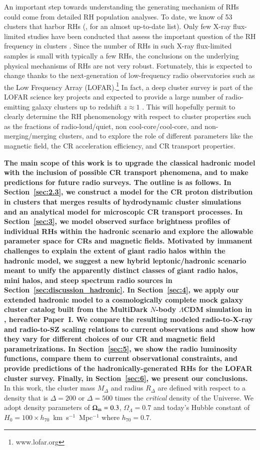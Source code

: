 \documentclass[useAMS,usenatbib]{mn2e}
\begin{document}
An important step towards understanding the generating mechanism of RHs could
come from detailed RH population analyses. To date, we know of 53 clusters that
harbor RHs (\citealp{2012A&ARv..20...54F}, for an almost up-to-date list). Only
few X-ray flux-limited studies have been conducted that assess the important
question of the RH frequency in clusters \citep{1999NewA....4..141G,
  VenturiGMRT_2,2013arXiv1306.3102K}. Since the number of RHs in such X-ray flux-limited samples is
small with typically a few RHs, the conclusions on the underlying physical
mechanisms of RHs are not very robust. Fortunately, this is expected to change
thanks to the next-generation of low-frequency radio observatories such as the
Low Frequency Array (LOFAR).\footnote{www.lofar.org} In fact, a deep cluster
survey is part of the LOFAR science key projects and expected to provide a large
number of radio-emitting galaxy clusters up to redshift $z\approx1$
\citep{2012JApA..tmp...34R}. This will hopefully permit
to clearly determine the RH phenomenology with respect to cluster properties
such as the fractions of radio-loud/quiet, non cool-core/cool-core, and
non-merging/merging clusters, and to explore the role of different parameters
like the magnetic field, the CR acceleration efficiency, and CR transport
properties.

{\bf The main scope of this work is to upgrade the classical hadronic model with
the inclusion of possible CR transport phenomena, and to make predictions for
future radio surveys. The outline is as follows. In Section~\ref{sec:2.3}, we 
construct a model for the CR proton distribution in clusters that merges results 
of hydrodynamic cluster simulations and an analytical model for microscopic 
CR transport processes. In Section~\ref{sec:3}, we model observed surface 
brightness profiles of individual RHs within the hadronic scenario and explore the 
allowable parameter space for CRs and magnetic fields. Motivated by immanent 
challenges to explain the extent of giant radio halos within the hadronic model, 
we suggest a new hybrid leptonic/hadronic scenario meant to unify the apparently 
distinct classes of giant radio halos, mini halos, and steep spectrum radio sources in 
Section~\ref{sec:discussion_hadronic}. In Section~\ref{sec:4}, we apply our
extended hadronic model to a cosmologically complete mock galaxy cluster 
catalog built from the MultiDark $N$-body $\Lambda$CDM simulation
in \cite{paper1}, hereafter Paper~I. 
We compare the resulting modeled radio-to-X-ray and radio-to-SZ
scaling relations to current observations and show how they vary for different
choices of our CR and magnetic field parametrizations. In Section~\ref{sec:5}, we show
the radio luminosity functions, compare them to current observational
constraints, and provide predictions of the hadronically-generated
RHs for the LOFAR cluster survey. Finally, in Section~\ref{sec:6}, we present 
our conclusions.} In this work, the cluster mass
$M_{\Delta}$ and radius $R_{\Delta}$ are defined with respect to a density that
is $\Delta=200$ or $\Delta=500$ times the \emph{critical} density of the
Universe. We adopt density parameters of $\Omega_{{\mathrm{m}}}=0.3$,
$\Omega_{\Lambda}=0.7$ and today's Hubble constant of $H_0 = 100 \times
h_{70}$~km~s$^{-1}$~Mpc$^{-1}$ where $h_{70} = 0.7$.
\end{document}
